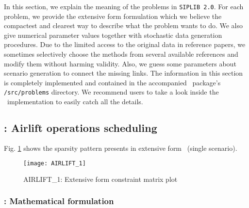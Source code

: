 In this section, we explain the meaning of the problems in \texttt{SIPLIB 2.0}. For each problem, we provide the extensive form formulation which we believe the compactest and clearest way to describe what the problem wants to do. We also give numerical parameter values together with stochastic data generation procedures. Due to the limited access to the original data in reference papers, we sometimes selectively choose the methods from several available references and modify them without harming validity. Also, we guess some parameters about scenario generation to connect the missing links. The information in this section is completely implemented and contained in the accompanied \julia\ package's \texttt{/src/problems} directory. We recommend users to take a look inside the \julia\ implementation to easily catch all the details.



\subsection{\airlift: Airlift operations scheduling} \label{AIRLIFT}

Fig. \ref{fig:airlift_sparsity} shows the sparsity pattern presents in extensive form \airlift\ (single scenario).
\begin{figure}[H]
	\centering
	\texttt{[image: AIRLIFT\_1]}
	\caption{AIRLIFT\_1: Extensive form constraint matrix plot}
	\label{fig:airlift_sparsity}
\end{figure}
\subsubsection{\airlift: Mathematical formulation}

